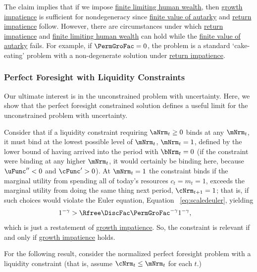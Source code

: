 \documentclass[BufferStockTheory]{subfiles}
\begin{document}
The claim implies that if we impose \hyperlink{FHWC}{finite limiting  human wealth}, then  \hyperlink{GIC}{growth impatience} is sufficient for nondegeneracy since \hyperlink{FVAC}{finite value of autarky} and \hyperlink{RIC}{return impatience} follow.
However, there are circumstances under which \hyperlink{RIC}{return impatience} and \hyperlink{FHWC}{finite limiting  human wealth} can hold while the \hyperlink{FVAC}{finite value of autarky} fails.
For example, if $\PermGroFac=0$, the problem is a standard `cake-eating' problem with a non-degenerate solution under \hyperlink{RIC}{return impatience}.


\subsubsection{Perfect Foresight with Liquidity Constraints}

Our ultimate interest is in the unconstrained problem with uncertainty.
Here, we show that the perfect foresight constrained solution defines a useful limit for the unconstrained problem with uncertainty.

Consider that if a liquidity constraint requiring $\aNrm_{t} \geq 0$ binds at any $\mNrm_{t}$, it must bind at the lowest possible level of $\mNrm_{t}$, $\mNrm_{t}=1$, defined by the lower bound of having arrived into the period with $\bNrm_{t}=0$ (if the constraint were binding at any higher $\mNrm_{t}$, it would certainly be binding here, because $\uFunc^{\prime\prime}<0$ and $\cFunc^{\prime}>0$).
At $\mNrm_{t}=1$ the constraint binds if the marginal utility from spending all of today's resources $c_{t}=m_{t}=1$, exceeds the marginal utility from doing the same thing next period, $\cNrm_{t+1}=1$; that is, if such choices would violate the Euler equation, Equation ~\eqref{eq:scaledeuler}, yielding
\begin{equation}\begin{gathered}\begin{aligned}
  1^{-\CRRA}  & > \Rfree \DiscFac \PermGroFac^{-\CRRA}1^{-\CRRA},  \label{eq:LiqConstrBinds}
\end{aligned}\end{gathered}\end{equation}
which is just a restatement of \hyperlink{GIC}{growth impatience}.
So, the constraint is relevant if and only if \hyperlink{GICRaw}{growth impatience} holds.

For the following result, consider the normalized perfect foresight problem with a liquidity constraint (that is, assume $\cNrm_{t}\leq \mNrm_{t}$ for each $t$.)
\end{document}
